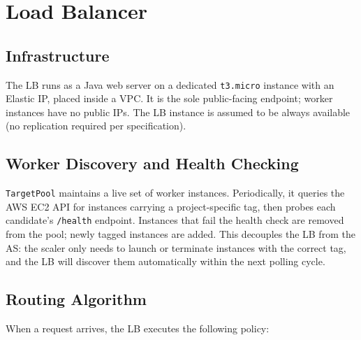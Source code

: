 \documentclass[10pt]{article}
\begin{document}
\section{Load Balancer}

\subsection{Infrastructure}
The LB runs as a Java web server on a dedicated \texttt{t3.micro} instance with
an Elastic IP, placed inside a VPC. It is the sole public-facing endpoint;
worker instances have no public IPs. The LB instance is assumed to be always
available (no replication required per specification).

\subsection{Worker Discovery and Health Checking}
\texttt{TargetPool} maintains a live set of worker instances. Periodically, it queries the AWS EC2 API for instances carrying a project-specific tag, then probes each candidate's \texttt{/health} endpoint. Instances that fail the health check are removed from the pool; newly tagged instances are added. This decouples the LB from the AS: the scaler only needs to launch or terminate instances with the correct tag, and the LB will discover them automatically within the next polling cycle.

\subsection{Routing Algorithm}
When a request arrives, the LB executes the following policy:
\end{document}

